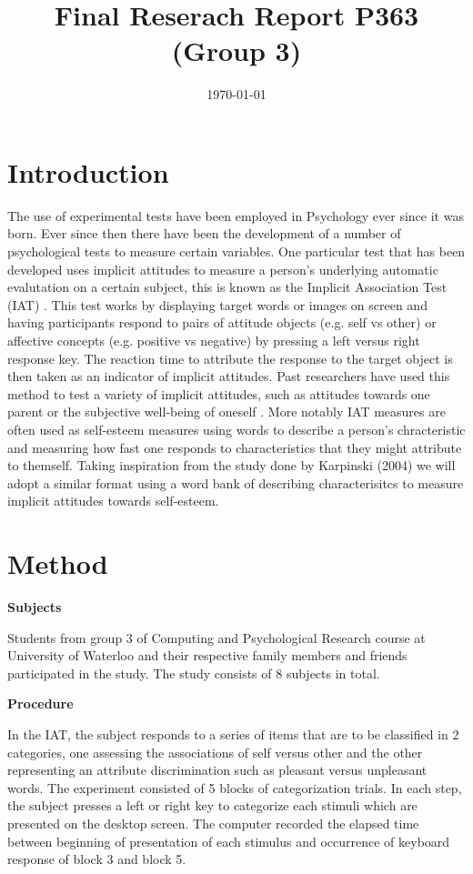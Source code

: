 \documentclass[11pt]{article}
\date{\today}
\title{Final Reserach Report P363 (Group 3)}
\begin{document}
\maketitle
\tableofcontents



\section{Introduction}
\label{sec:org508de13}

The use of experimental tests have been employed in Psychology ever since it was born. Ever since then there have been the development of a number of psychological tests to measure certain variables. One particular test that has been developed uses implicit attitudes to measure a person's underlying automatic evalutation on a certain subject, this is known as the Implicit Association Test (IAT) \cite{greenwald_mcghee_schwartz_1998}. This test works by displaying target words or images on screen and having participants respond to pairs of attitude objects (e.g. self vs other) or affective concepts (e.g. positive vs negative) by pressing a left versus right response key. The reaction time to attribute the response to the target object is then taken as an indicator of implicit attitudes. Past researchers have used this method to test a variety of implicit attitudes, such as attitudes towards one parent \cite{Yang_2013} or the subjective well-being of oneself \cite{Walker_Schimmack_2008}. More notably IAT measures are often used as self-esteem measures using words to describe a person's chracteristic and measuring how fast one responds to characteristics that they might attribute to themself. Taking inspiration from the study done by Karpinski (2004) we will adopt a similar format using a word bank of describing characterisitcs to measure implicit attitudes towards self-esteem. 

\section{Method}
\label{sec:org3bb190f}

\textbf{Subjects}

Students from group 3 of Computing and Psychological Research course at University of Waterloo and their respective family members and friends participated in the study. The study consists of 8 subjects in total. 

\textbf{Procedure}

In the IAT, the subject responds to a series of items that are to be classified in 2 categories, one assessing the associations of self versus other and the other representing an attribute discrimination such as pleasant versus unpleasant words. The experiment consisted of 5 blocks of categorization trials. In each step, the subject presses a left or right key to categorize each stimuli which are presented on the desktop screen. The computer recorded the elapsed time between beginning of presentation of each stimulus and occurrence of keyboard response of block 3 and block 5.
\end{document}
